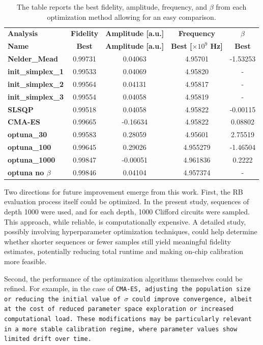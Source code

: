 \begin{table}[h]
    \centering
    \begin{tabular}{lcccc}
        \toprule
        \textbf{Analysis} & \textbf{Fidelity} & \textbf{Amplitude [a.u.]} & \textbf{Frequency} & \textbf{$\beta$} \\
        \textbf{Name} & \textbf{Best} & \textbf{Amplitude [a.u.]} & \textbf{Best [$\times10^9$ Hz]} & \textbf{Best} \\
        \midrule
        \textbf{Nelder\_Mead} & 0.99731 & 0.04063 & 4.95701 & -1.53253 \\
        \textbf{init\_simplex\_1} & 0.99533 & 0.04069 & 4.95820 & - \\
        \textbf{init\_simplex\_2} & 0.99564 & 0.04131 & 4.95817 & - \\
        \textbf{init\_simplex\_3} & 0.99554 & 0.04058 & 4.95819 & - \\
        \textbf{SLSQP} & 0.99518 & 0.04058 & 4.95822 & -0.00115 \\
        \textbf{CMA-ES} & 0.99665 & -0.16634 & 4.95822 & 0.08802 \\
        \textbf{optuna\_30} & 0.99583 & 0.28059 & 4.95601 & 2.75519 \\
        \textbf{optuna\_100} & 0.99645 & 0.29026 & 4.955279 & -1.46504 \\
        \textbf{optuna\_1000} & 0.99847 & -0.00051 & 4.961836 & 0.2222 \\
        \textbf{optuna no $\beta$} & 0.99846 & 0.04104 & 4.957374 & - \\
        \bottomrule
    \end{tabular}
    \caption{The table reports the best fidelity, amplitude, frequency, and $\beta$ from each optimization method allowing for an easy comparison.}
    \label{tab:best_param}
\end{table}

Two directions for future improvement emerge from this work. 
First, the RB evaluation process itself could be optimized. 
In the present study, sequences of depth 1000 were used, and for each depth, 1000 Clifford circuits were sampled. 
This approach, while reliable, is computationally expensive. 
A detailed study, possibly involving hyperparameter optimization techniques, could help determine whether shorter sequences or fewer samples still yield meaningful fidelity estimates, potentially reducing total runtime and making on-chip calibration more feasible.

Second, the performance of the optimization algorithms themselves could be refined. 
For example, in the case of \tt{CMA-ES}, adjusting the population size or reducing the initial value of $\sigma$ could improve convergence, albeit at the cost of reduced parameter space exploration or increased computational load. 
These modifications may be particularly relevant in a more stable calibration regime, where parameter values show limited drift over time.

